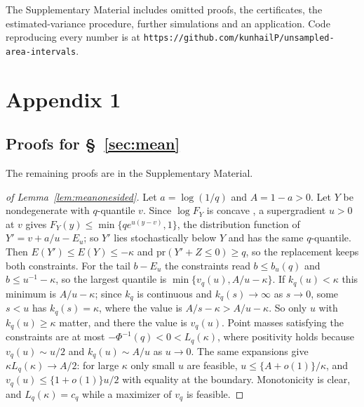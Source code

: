 \documentclass[lineno]{biometrika}
\newcommand{\pr}{\mathrm{pr}}
\begin{document}
The Supplementary Material includes omitted proofs, the certificates, the estimated-variance procedure, further simulations and an application. Code reproducing every number is at \texttt{https://github.com/kunhailP/unsampled-area-intervals}.

\appendix

\appendixone
\section*{Appendix 1}
\subsection*{Proofs for \S~\ref{sec:mean}}

The remaining proofs are in the Supplementary Material.

\begin{proof}[of Lemma~\ref{lem:meanonesided}]
Let $a = \log(1/q)$ and $A = 1 - a > 0$. Let $Y$ be nondegenerate with $q$-quantile $v$. Since $\log F_Y$ is concave \citep{prekopa1973}, a supergradient $u > 0$ at $v$ gives $F_Y(y) \le \min\{qe^{u(y - v)}, 1\}$, the distribution function of $Y' = v + a/u - E_u$; so $Y'$ lies stochastically below $Y$ and has the same $q$-quantile. Then $E(Y') \le E(Y) \le -\kappa$ and $\pr(Y' + Z \le 0) \ge q$, so the replacement keeps both constraints. For the tail $b - E_u$ the constraints read $b \le b_u(q)$ and $b \le u^{-1} - \kappa$, so the largest quantile is $\min\{v_q(u), A/u - \kappa\}$. If $k_q(u) < \kappa$ this minimum is $A/u - \kappa$; since $k_q$ is continuous and $k_q(s) \to \infty$ as $s \to 0$, some $s < u$ has $k_q(s) = \kappa$, where the value is $A/s - \kappa > A/u - \kappa$. So only $u$ with $k_q(u) \ge \kappa$ matter, and there the value is $v_q(u)$. Point masses satisfying the constraints are at most $-\Phi^{-1}(q) < 0 < L_q(\kappa)$, where positivity holds because $v_q(u) \sim u/2$ and $k_q(u) \sim A/u$ as $u \to 0$. The same expansions give $\kappa L_q(\kappa) \to A/2$: for large $\kappa$ only small $u$ are feasible, $u \le \{A + o(1)\}/\kappa$, and $v_q(u) \le \{1 + o(1)\}u/2$ with equality at the boundary. Monotonicity is clear, and $L_q(\kappa) = c_q$ while a maximizer of $v_q$ is feasible.
\end{proof}
\end{document}

